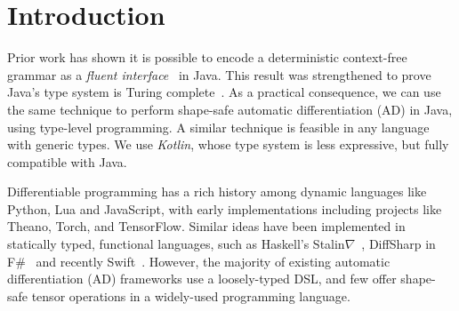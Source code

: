 \documentclass{article}
\begin{document}


    \printAffiliationsAndNotice{}  %

    \section{Introduction}
    \label{submission}

    Prior work has shown it is possible to encode a deterministic context-free grammar as a \textit{fluent interface}~\cite{gil2016formal} in Java. This result was strengthened to prove Java's type system is Turing complete~\cite{Grigore:2017:JGT:3009837.3009871}. As a practical consequence, we can use the same technique to perform shape-safe automatic differentiation (AD) in Java, using type-level programming. A similar technique is feasible in any language with generic types. We use \textit{Kotlin}, whose type system is less expressive, but fully compatible with Java.

    Differentiable programming has a rich history among dynamic languages like Python, Lua and JavaScript, with early implementations including projects like Theano, Torch, and TensorFlow. Similar ideas have been implemented in statically typed, functional languages, such as Haskell's Stalin$\nabla$~\cite{pearlmutter2008using}, DiffSharp in F\#~\cite{DBLP:journals/corr/BaydinPS15} and recently Swift~\cite{swift}. However, the majority of existing automatic differentiation (AD) frameworks use a loosely-typed DSL, and few offer shape-safe tensor operations in a widely-used programming language.
\end{document}

